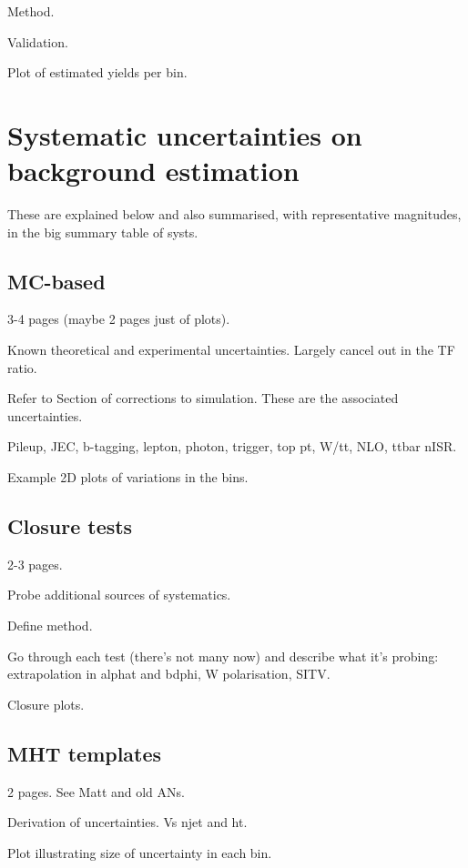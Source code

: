 Method.

Validation.

Plot of estimated yields per bin.

\section{Systematic uncertainties on background estimation}

These are explained below and also summarised, with representative magnitudes, 
in the big summary table of systs.

\subsection{MC-based}
3-4 pages (maybe 2 pages just of plots).

Known theoretical and experimental uncertainties.
Largely cancel out in the TF ratio.

Refer to Section of corrections to simulation. These are the associated 
uncertainties.

Pileup, JEC, b-tagging, lepton, photon, trigger, top pt, W/tt, NLO, ttbar nISR.

Example 2D plots of variations in the bins.

\subsection{Closure tests}
2-3 pages.

Probe additional sources of systematics.

Define method.

Go through each test (there's not many now) and describe what it's probing: 
extrapolation in alphat and bdphi, W polarisation, SITV.

Closure plots.

\subsection{MHT templates}
2 pages. See Matt and old ANs.

Derivation of uncertainties. Vs njet and ht.

Plot illustrating size of uncertainty in each bin.
